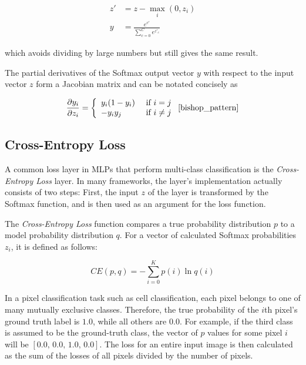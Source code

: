 \begin {align}
	z' &= z - \max \limits_{i}(0, z_i)\\
	y &= \frac{e^{c'}}{\sum_{c=0}^{C} e^{z'_{{c}}}}
\end {align}

\noindent which avoids dividing by large numbers but still gives the same result. \cite[p. 81]{deeplearning_book}

The partial derivatives of the Softmax output vector $y$ with respect to the input vector $z$ form a Jacobian matrix and can be notated concisely as

\begin {align}
\label{eq:softmax_deriv}
	\frac{\partial y_i}{\partial z_i} = \bigg \{ \begin {array}{ll}
								y_i(1 - y_i)& \text{ if } i = j \\
								-y_i y_j& \text{ if } i \neq j
							\end{array}
	\,\,\cite[\text{ p. 209}]{bishop_pattern}
\end {align}


		\subsection{Cross-Entropy Loss}
\label{subsec:cross_ent}

A common loss layer in MLPs that perform multi-class classification is the \textit{Cross-Entropy Loss} layer. In many frameworks, the layer's implementation actually consists of two steps: First, the input $z$ of the layer is transformed by the Softmax function, and is then used as an argument for the loss function.

The \textit{Cross-Entropy Loss} function compares a true probability distribution $p$ to a model probability distribution $q$. For a vector of calculated Softmax probabilities $z_i$, it is defined as follows:

\[CE(p, q) = -\sum \limits_{i = 0}^{K} p(i) \ln q(i)\]

\noindent In a pixel classification task such as cell classification, each pixel belongs to one of many mutually exclusive classes. Therefore, the true probability of the $i$th pixel's ground truth label is $1.0$, while all others are $0.0$. For example, if the third class is assumed to be the ground-truth class, the vector of $p$ values for some pixel $i$ will be $[0.0,\, 0.0,\, 1.0,\, 0.0]$. The loss for an entire input image is then calculated as the sum of the losses of all pixels divided by the number of pixels.

